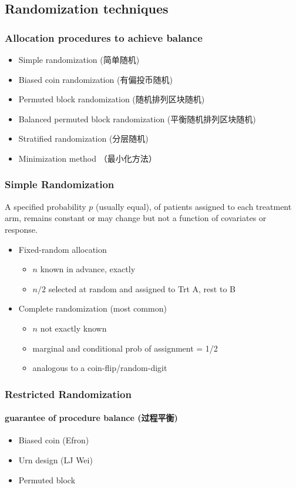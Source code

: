 \documentclass[table,10pt]{beamer}
\begin{document}
\begin{CJK*}{UTF8}{gbsn}
\section{Randomization techniques}


\begin{frame}[t]
\frametitle{Allocation procedures to achieve balance}
\begin{itemize}[<+->]
	\item Simple randomization (简单随机)
	\item Biased coin randomization (有偏投币随机)
	\item Permuted block randomization (随机排列区块随机)
	\item Balanced permuted block randomization (平衡随机排列区块随机)
	\item Stratified randomization (分层随机)
	\item Minimization method （最小化方法）
\end{itemize}
\end{frame}


\begin{frame}[t]
\frametitle{Simple Randomization}
A specified probability $p$ (usually equal), of patients assigned to 
each treatment arm, remains constant or may change but not a function 
of covariates or response.
\begin{itemize}[<+->]
	\item Fixed-random allocation
	\begin{itemize}
		\item $n$ known in advance, exactly
		\item $n/2$ selected at random and assigned to Trt A, rest to B
	\end{itemize}
	\item Complete randomization (most common)
	\begin{itemize}
		\item $n$ not exactly known
		\item marginal and conditional prob of assignment = 1/2
		\item analogous to a coin-flip/random-digit
	\end{itemize}
\end{itemize}
\end{frame}


\begin{frame}[t]
\frametitle{Restricted Randomization}
\framesubtitle{guarantee of procedure balance (过程平衡)}
\begin{itemize}
	\item Biased coin (Efron)
	\item Urn design (LJ Wei)
	\item Permuted block
\end{itemize}
\end{frame}



\end{CJK*}
\end{document}
